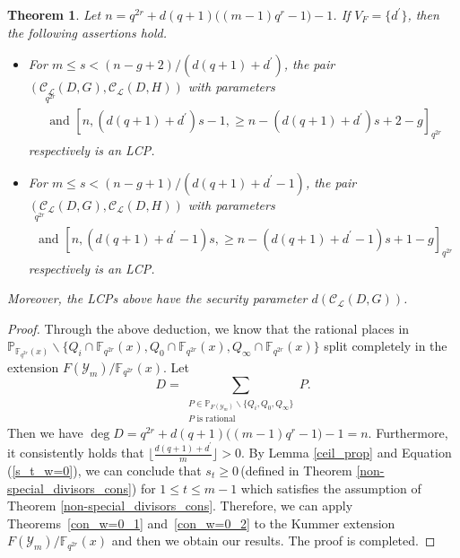 \documentclass[journal,12pt,onecolumn]{IEEEtran}
\newtheorem{theorem}{Theorem}
\begin{document}
\begin{theorem}
    Let $n = q^{2r} + d(q+1)\big((m-1)q^r-1\big)-1$. If $V_F = \{d^\prime\}$, then the following assertions hold.
    \begin{itemize}
        \item For $m\le s <(n-g+2)/(d(q+1)+d^\prime)$, the pair $(\mathcal{C}_{\mathcal{L}}(D,G),\mathcal{C}_{\mathcal{L}}(D,H))$ with parameters
        \begin{gather*}
            [n,n-(d(q+1)+d^\prime)s+1,\ge (d(q+1)+d^\prime)s-g]_{q^{2r}}\\
            \text{ and }[n,(d(q+1)+d^\prime)s-1,\ge n-(d(q+1)+d^\prime)s+2-g]_{q^{2r}}
        \end{gather*}
        respectively is an LCP. 
        \item For $m\le s <(n-g+1)/(d(q+1)+d^\prime-1)$, the pair $(\mathcal{C}_{\mathcal{L}}(D,G),\mathcal{C}_{\mathcal{L}}(D,H))$ with parameters
        \begin{gather*}
            [n,n-(d(q+1)+d^\prime-1)s,\ge (d(q+1)+d^\prime-1)s+1-g]_{q^{2r}}\\
            \text{ and }[n,(d(q+1)+d^\prime-1)s,\ge n-(d(q+1)+d^\prime-1)s+1-g]_{q^{2r}}
        \end{gather*}
        respectively is an LCP. 
    \end{itemize}
    Moreover, the LCPs above have the security parameter $d(\mathcal{C}_{\mathcal{L}}(D,G))$. 
\end{theorem}
\begin{proof}
    Through the above deduction, we know that the rational places in $\mathbb{P}_{\mathbb{F}_{q^{2r}}(x)}\backslash\{Q_i\cap\mathbb{F}_{q^{2r}}(x),Q_0\cap\mathbb{F}_{q^{2r}}(x),Q_\infty\cap\mathbb{F}_{q^{2r}}(x)\}$ split completely in the extension $F(\mathcal{Y}_m)/\mathbb{F}_{q^{2r}}(x)$. Let 
    \[
        D = \sum_{\substack{P\in\mathbb{P}_{F(\mathcal{Y}_m)}\backslash\{Q_i,Q_0,Q_\infty\}\\  P \text{ is rational}}}P.
    \]
    Then we have $\deg D = q^{2r} + d(q+1)\big((m-1)q^r-1\big)-1 = n$. Furthermore, it consistently holds that $\big\lfloor \frac{d(q+1)+d^\prime}{m} \big\rfloor>0$. By Lemma \ref{ceil_prop} and Equation (\ref{s_t_w=0}), we can conclude that $s_t\ge 0$\,(defined in Theorem \ref{non-special_divisors_cons}) for $1\le t\le m-1$ which satisfies the assumption of Theorem \ref{non-special_divisors_cons}. Therefore, we can apply Theorems~\ref{con_w=0_1} and~\ref{con_w=0_2} to the Kummer extension $F(\mathcal{Y}_m)/\mathbb{F}_{q^{2r}}(x)$ and then we obtain our results. The proof is completed. 
\end{proof}
\end{document}

